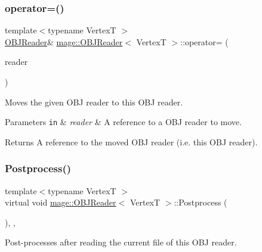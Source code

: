 \subsubsection{\texorpdfstring{operator=()}{operator=()}\hspace{0.1cm}{\footnotesize\ttfamily [2/2]}}
{\footnotesize\ttfamily template$<$typename VertexT $>$ \\
\hyperlink{classmage_1_1_o_b_j_reader}{O\+B\+J\+Reader}\& \hyperlink{classmage_1_1_o_b_j_reader}{mage\+::\+O\+B\+J\+Reader}$<$ VertexT $>$\+::operator= (\begin{DoxyParamCaption}\item[{\hyperlink{classmage_1_1_o_b_j_reader}{O\+B\+J\+Reader}$<$ VertexT $>$ \&\&}]{reader }\end{DoxyParamCaption})\hspace{0.3cm}{\ttfamily [delete]}}

Moves the given O\+BJ reader to this O\+BJ reader.


\begin{DoxyParams}[1]{Parameters}
\mbox{\tt in}  & {\em reader} & A reference to a O\+BJ reader to move. \\
\hline
\end{DoxyParams}
\begin{DoxyReturn}{Returns}
A reference to the moved O\+BJ reader (i.\+e. this O\+BJ reader). 
\end{DoxyReturn}
\hypertarget{classmage_1_1_o_b_j_reader_a248977c8300575ed2bab04df26197919}{}\label{classmage_1_1_o_b_j_reader_a248977c8300575ed2bab04df26197919} 
\subsubsection{\texorpdfstring{Postprocess()}{Postprocess()}}
{\footnotesize\ttfamily template$<$typename VertexT $>$ \\
virtual void \hyperlink{classmage_1_1_o_b_j_reader}{mage\+::\+O\+B\+J\+Reader}$<$ VertexT $>$\+::Postprocess (\begin{DoxyParamCaption}{ }\end{DoxyParamCaption})\hspace{0.3cm}{\ttfamily [override]}, {\ttfamily [private]}, {\ttfamily [virtual]}}

Post-\/processes after reading the current file of this O\+BJ reader.


